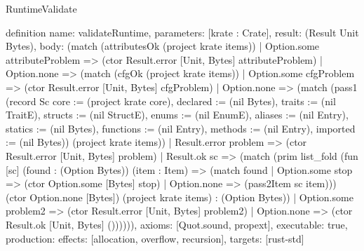 \begin{lexlean}{RuntimeValidate}
\begin{semanticmodule}
definition{
  name: validateRuntime,
  parameters: [krate : Crate],
  result: (Result Unit Bytes),
  body: (match (attributesOk (project krate items))
    | Option.some attributeProblem => (ctor Result.error [Unit, Bytes] attributeProblem)
    | Option.none => (match (cfgOk (project krate items))
      | Option.some cfgProblem => (ctor Result.error [Unit, Bytes] cfgProblem)
      | Option.none => (match (pass1 (record Sc {core := (project krate core), declared := (nil Bytes), traits := (nil TraitE), structs := (nil StructE), enums := (nil EnumE), aliases := (nil Entry), statics := (nil Bytes), functions := (nil Entry), methods := (nil Entry), imported := (nil Bytes)}) (project krate items))
        | Result.error problem => (ctor Result.error [Unit, Bytes] problem)
        | Result.ok sc => (match (prim list_fold (fun [sc] (found : (Option Bytes)) (item : Item) => (match found
            | Option.some stop => (ctor Option.some [Bytes] stop)
            | Option.none => (pass2Item sc item))) (ctor Option.none [Bytes]) (project krate items) : (Option Bytes))
          | Option.some problem2 => (ctor Result.error [Unit, Bytes] problem2)
          | Option.none => (ctor Result.ok [Unit, Bytes] ()))))),
  axioms: [Quot.sound, propext],
  executable: true,
  production: {effects: [allocation, overflow, recursion], targets: [rust-std]}
}
\end{semanticmodule}
\end{lexlean}
